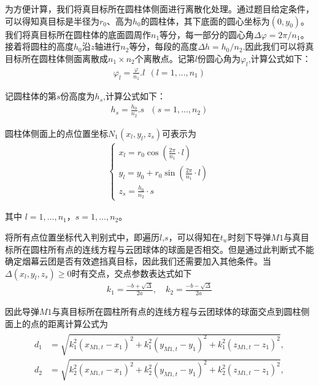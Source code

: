 \documentclass[../main.tex]{subfiles}
\begin{document}
\par 为方便计算，我们将真目标所在圆柱体侧面进行离散化处理。通过题目给定条件，可以得知真目标是半径为$r_0$、高为$h_0$的圆柱体，其下底面的圆心坐标为$\left( 0,y_0 \right)$。我们将真目标所在圆柱体的底面圆周作$n_1$等分，每一部分的圆心角$\varDelta \varphi =2\pi /n_1$。接着将圆柱的高度$h_0$沿$z$轴进行$n_2$等分，每段的高度$\varDelta h=h_0/n_2$.因此我们可以将真目标所在圆柱体侧面离散成$n_1\times n_2$个离散点。记第$l$份圆心角为$\varphi _l$,计算公式如下：
\begin{align}\label{1.13}
	\varphi _l=\frac{\varphi}{n_1}.l\ \ \left( l=1,...,n_1 \right) 
\end{align}
\par 记圆柱体的第$s$份高度为$h_s$,计算公式如下：
\begin{align}\label{1.14}
	h_s=\frac{h_0}{n_2}.s\,\,\,\,\left( s=1,...,n_2 \right) 
\end{align}
\par 圆柱体侧面上的点位置坐标$N_1\left( x_l,y_l,z_s \right) $可表示为
\begin{align}
	\begin{cases}\label{1.15}
x_l = r_0 \cos\left( \frac{2\pi}{n_1} \cdot l \right) \\
y_l = y_0 + r_0 \sin\left( \frac{2\pi}{n_1} \cdot l \right) \\
z_s = \frac{h_0}{n_2} \cdot s
\end{cases}
\end{align}	
\par 其中 \( l = 1, \dots, n_1 \)，\( s = 1, \dots, n_2 \)。
\par 将所有点位置坐标代入判别式中，即遍历$l$,$s$，可以得知在$t_w$时刻下导弹$M1$与真目标所在圆柱所有点的连线方程与云团球体的球面是否相交。但是通过此判断式不能确定烟幕云团是否有效遮挡真目标，因此我们还需要加入其他条件。当$\Delta \left( x_l,y_l,z_s \right) \ge 0$时有交点，交点参数表达式如下
\begin{align}\label{1.16}
k_1 = \frac{-b + \sqrt{\Delta}}{2a}, \quad k_2 = \frac{-b - \sqrt{\Delta}}{2a}
\end{align}
\par 因此导弹$M1$与真目标所在圆柱所有点的连线方程与云团球体的球面交点到圆柱侧面上的点的距离计算公式为
\begin{align}\label{1.17}
	\begin{aligned}
d_1 &= \sqrt{k_1^2(x_{M1,t} - x_1)^2 + k_1^2(y_{M1,t} - y_1)^2 + k_1^2(z_{M1,t} - z_1)^2}, \\
d_2 &= \sqrt{k_2^2(x_{M1,t} - x_1)^2 + k_2^2(y_{M1,t} - y_1)^2 + k_2^2(z_{M1,t} - z_1)^2},
\end{aligned}
\end{align}
\end{document}
